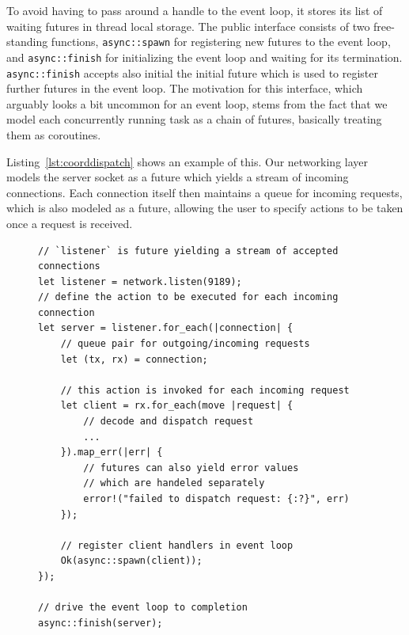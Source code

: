 To avoid having to pass around a handle to the event loop, it stores its 
list of waiting futures in thread local storage. The public interface consists 
of two free-standing functions, \lstinline{async::spawn} for registering
new futures to the event loop, and \lstinline{async::finish} for initializing
the event loop and waiting for its termination. \lstinline{async::finish} accepts
also initial the initial future which is used to register further futures in
the event loop. The motivation for this interface, which arguably looks
a bit uncommon for an event loop, stems from the fact that we model each
concurrently running task as a chain of futures, basically treating them as
coroutines.  

Listing~\ref{lst:coorddispatch} shows an example of this. Our networking layer
models the server socket as a future which yields a stream of incoming connections.
Each connection itself then maintains a queue for incoming requests, which is
also modeled as a future, allowing the user to specify actions to be taken
once a request is received.

\begin{figure}[h]
\begin{lstlisting}[caption={[Connection handling at the coordinator]%
Accepting and dispatching incoming connections. The actions specified
in \lstinline{for_each} and \lstinline{map_err} are invoked by the
event loop if the corresponding events (such as new incoming connections,
new incoming requests or errors during request handling) occur.},label={lst:coorddispatch}]
// `listener` is future yielding a stream of accepted connections
let listener = network.listen(9189);
// define the action to be executed for each incoming connection
let server = listener.for_each(|connection| {
    // queue pair for outgoing/incoming requests
    let (tx, rx) = connection;
   
    // this action is invoked for each incoming request
    let client = rx.for_each(move |request| {
        // decode and dispatch request 
        ...
    }).map_err(|err| {
        // futures can also yield error values
        // which are handeled separately
        error!("failed to dispatch request: {:?}", err)
    });

    // register client handlers in event loop
    Ok(async::spawn(client));
});

// drive the event loop to completion
async::finish(server);
\end{lstlisting}
\end{figure}

